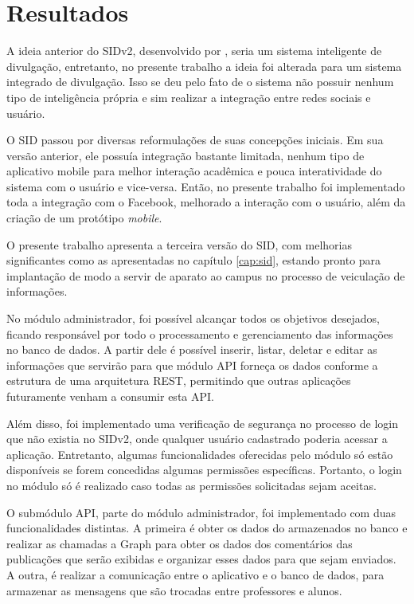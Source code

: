 \chapter[Resultados]{Resultados}
A ideia anterior do SIDv2, desenvolvido por \cite{sobrinho2017}, seria um sistema inteligente de divulgação, entretanto, no presente trabalho a ideia foi alterada para um sistema integrado de divulgação. Isso se deu pelo fato de o sistema não possuir nenhum tipo de inteligência própria e sim realizar a integração entre redes sociais e usuário.

O SID passou por diversas reformulações de suas concepções iniciais. Em sua versão anterior, ele possuía integração bastante limitada, nenhum tipo de aplicativo mobile para melhor interação acadêmica e pouca interatividade do sistema com o usuário e vice-versa. Então, no presente trabalho foi implementado toda a integração com o Facebook, melhorado a interação com o usuário, além da criação de um protótipo \textit{mobile}.

O presente trabalho apresenta a terceira versão do SID, com melhorias significantes como as apresentadas no capítulo \ref{cap:sid}, estando pronto para implantação de modo a servir de aparato ao campus no processo de veiculação de informações.

No módulo administrador, foi possível alcançar todos os objetivos desejados, ficando responsável por todo o processamento e gerenciamento das informações no banco de dados. A partir dele é possível inserir, listar, deletar e editar as informações que servirão para que módulo API forneça os dados conforme a estrutura de uma arquitetura REST, permitindo que outras aplicações futuramente venham a consumir esta API.

Além disso, foi implementado uma verificação de segurança no processo de login que não existia no SIDv2, onde qualquer usuário cadastrado poderia acessar a aplicação. Entretanto, algumas funcionalidades oferecidas pelo módulo só estão disponíveis se forem concedidas algumas permissões específicas. Portanto, o login no módulo só é realizado caso todas as permissões solicitadas sejam aceitas.

O submódulo API, parte do módulo administrador, foi implementado com duas funcionalidades distintas. A primeira é obter os dados do armazenados no banco e realizar as chamadas a Graph para obter os dados dos comentários das publicações que serão exibidas e organizar esses dados para que sejam enviados. A outra, é realizar a comunicação entre o aplicativo e o banco de dados, para armazenar as mensagens que são trocadas entre professores e alunos.

